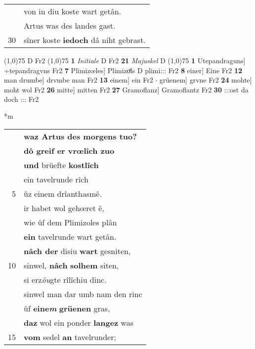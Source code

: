 \documentclass[8pt,a4paper,notitlepage]{article}
\begin{document}
\begin{table}[ht]
\begin{minipage}[t]{0.5\linewidth}
\begin{tabular}{rl}
 & von in diu koste wart getân.\\ 
 & Artus was des landes gast.\\ 
30 & sîner koste \textbf{iedoch} dâ niht gebrast.\\ 
\end{tabular}
\scriptsize
\line(1,0){75} \newline
D Fr2 \newline
\line(1,0){75} \newline
\textbf{1} \textit{Initiale} D Fr2  \textbf{21} \textit{Majuskel} D  \newline
\line(1,0){75} \newline
\textbf{1} Utepandraguns] ÷tepandragvns Fr2 \textbf{7} Plimizœles] Plimizoͤls D plimi::: Fr2 \textbf{8} einer] Eine Fr2 \textbf{12} man drumbe] drvmbe man Fr2 \textbf{13} einem] ein Fr2  $\cdot$ grüenem] grvne Fr2 \textbf{24} mohte] moht wol Fr2 \textbf{26} mitte] mitten Fr2 \textbf{27} Gramoflanz] Gramoflantz Fr2 \textbf{30} :::ost da doch ::: Fr2 \newline
\end{minipage}
\hspace{0.5cm}
\begin{minipage}[t]{0.5\linewidth}
\small
\begin{center}*m
\end{center}
\begin{tabular}{rl}
 & \textbf{waz Artus des morgens tuo?}\\ 
 & \textbf{dô greif er vrœlîch zuo}\\ 
 & \textbf{und} brüefte \textbf{kostlîch}\\ 
 & ein tavelrunde rîch\\ 
5 & ûz einem drîanthasmê.\\ 
 & ir habet wol gehœret ê,\\ 
 & wie ûf dem Plimizoles plân\\ 
 & \textbf{ein} tavelrunde wart getân.\\ 
 & \textbf{nâch der} disiu \textbf{wart} gesniten,\\ 
10 & sinwel, \textbf{nâch} \textbf{solhem} siten,\\ 
 & si erz\textit{öu}gte rîlîchiu dinc.\\ 
 & sinwel man dar umb nam den rinc\\ 
 & ûf \textbf{eine\textit{m}} \textbf{grüenen} gras,\\ 
 & \textbf{daz} wol ein ponder \textbf{langez} was\\ 
15 & \textbf{vom} sedel \textbf{an} tavelrunder;\\ 

\end{tabular}
\end{minipage}
\end{table}
\end{document}
